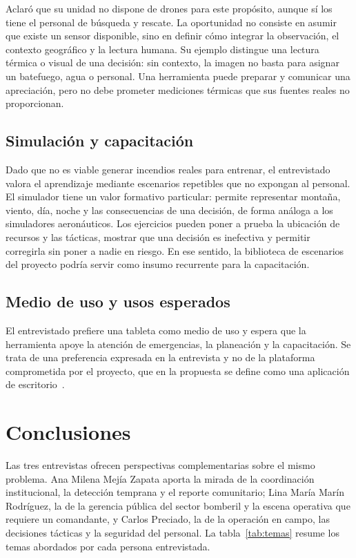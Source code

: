 Aclaró que su unidad no dispone de drones para este propósito, aunque sí los tiene el personal de búsqueda y rescate. La oportunidad no consiste en asumir que existe un sensor disponible, sino en definir cómo integrar la observación, el contexto geográfico y la lectura humana. Su ejemplo distingue una lectura térmica o visual de una decisión: sin contexto, la imagen no basta para asignar un batefuego, agua o personal. Una herramienta puede preparar y comunicar una apreciación, pero no debe prometer mediciones térmicas que sus fuentes reales no proporcionan.

\subsection{Simulación y capacitación}

Dado que no es viable generar incendios reales para entrenar, el entrevistado valora el aprendizaje mediante escenarios repetibles que no expongan al personal. El simulador tiene un valor formativo particular: permite representar montaña, viento, día, noche y las consecuencias de una decisión, de forma análoga a los simuladores aeronáuticos. Los ejercicios pueden poner a prueba la ubicación de recursos y las tácticas, mostrar que una decisión es inefectiva y permitir corregirla sin poner a nadie en riesgo. En ese sentido, la biblioteca de escenarios del proyecto podría servir como insumo recurrente para la capacitación.

\subsection{Medio de uso y usos esperados}

El entrevistado prefiere una tableta como medio de uso y espera que la herramienta apoye la atención de emergencias, la planeación y la capacitación. Se trata de una preferencia expresada en la entrevista y no de la plataforma comprometida por el proyecto, que en la propuesta se define como una aplicación de escritorio~\cite{propuesta2026}.

\section{Conclusiones}\label{sec:conclusiones}

Las tres entrevistas ofrecen perspectivas complementarias sobre el mismo problema. Ana Milena Mejía Zapata aporta la mirada de la coordinación institucional, la detección temprana y el reporte comunitario; Lina María Marín Rodríguez, la de la gerencia pública del sector bomberil y la escena operativa que requiere un comandante, y Carlos Preciado, la de la operación en campo, las decisiones tácticas y la seguridad del personal. La tabla~\ref{tab:temas} resume los temas abordados por cada persona entrevistada.

